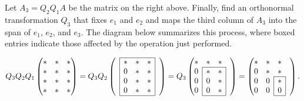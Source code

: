 %
%

Let $A_3 = Q_2Q_1A$ be the matrix on the right above. 
Finally, find an orthonormal transformation $Q_3$ that fixes $e_1$ and $e_2$ and maps the third column of $A_3$ into the span of $e_1$, $e_2$, and $e_3$. 
The diagram below summarizes this process, where boxed entries indicate those affected by the operation just performed.

\begin{equation*}
Q_3 Q_2 Q_1
\begin{pmatrix}
* & * & * \\
* & * & * \\
* & * & * \\
* & * & *
\end{pmatrix}
= Q_3 Q_2
\begin{pmatrix}  \cline{2-4}
&\lc{*} & * & \mc{*} & \\
&\lc{0} & * & \mc{*}& \\
&\lc{0} & * & \mc{*} & \\
&\lc{0}& * & \mc{*} & \\ \cline{2-4}
\end{pmatrix}
= Q_3
\begin{pmatrix}
* & * & * \\ \cline{2-3}
\mc{0} & * & \mc{*} \\
\mc{0} & 0 & \mc{*} \\
\mc{0} & 0 & \mc{*} & \\ \cline{2-3}
\end{pmatrix}
=
\begin{pmatrix}
* & * & * \\
0 & * & * \\ \cline{3-3}
0 & \mc{0} & \mc{*} \\
0 & \mc{0} & \mc{0} & \\ \cline{3-3}
\end{pmatrix}.
\end{equation*}


